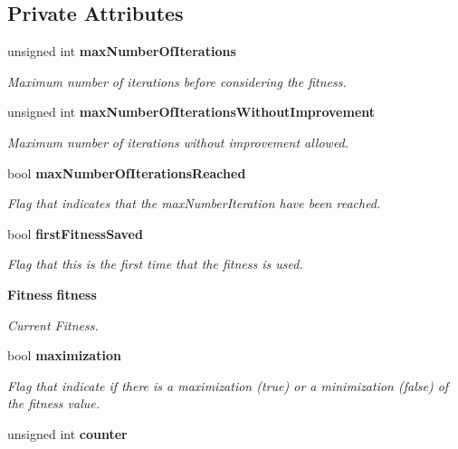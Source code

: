 \subsection*{Private Attributes}
\begin{CompactItemize}
\item 
unsigned int {\bf maxNumberOfIterations}\label{classmo_steady_fit_sol_continue_36b43c2a252887ad027165ac32393fe8}

\begin{CompactList}\small\item\em Maximum number of iterations before considering the fitness. \item\end{CompactList}\item 
unsigned int {\bf maxNumberOfIterationsWithoutImprovement}\label{classmo_steady_fit_sol_continue_cde593c09f497a5fa66ff62732544f40}

\begin{CompactList}\small\item\em Maximum number of iterations without improvement allowed. \item\end{CompactList}\item 
bool {\bf maxNumberOfIterationsReached}\label{classmo_steady_fit_sol_continue_7d88c0eb91b2a12121ba1c3ae9139887}

\begin{CompactList}\small\item\em Flag that indicates that the maxNumberIteration have been reached. \item\end{CompactList}\item 
bool {\bf firstFitnessSaved}\label{classmo_steady_fit_sol_continue_025bf2789e470fdde989eee9121035c3}

\begin{CompactList}\small\item\em Flag that this is the first time that the fitness is used. \item\end{CompactList}\item 
{\bf Fitness} {\bf fitness}\label{classmo_steady_fit_sol_continue_a5c62e7049b36f6e71e92b559568c09e}

\begin{CompactList}\small\item\em Current Fitness. \item\end{CompactList}\item 
bool {\bf maximization}
\begin{CompactList}\small\item\em Flag that indicate if there is a maximization (true) or a minimization (false) of the fitness value. \item\end{CompactList}\item 
unsigned int {\bf counter}\label{classmo_steady_fit_sol_continue_245c9099a2c40dfc4f34b3ff216d13ce}


\end{CompactItemize}
